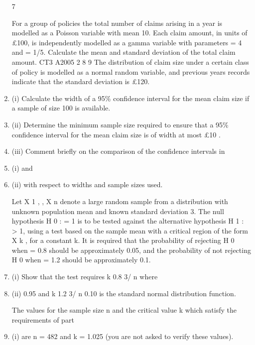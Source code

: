 \documentclass[a4paper,12pt]{article}
\begin{document}
\begin{enumerate}
7

For a group of policies the total number of claims arising in a year is modelled as a Poisson variable with mean 10. Each claim amount, in units of £100, is independently modelled as a gamma variable with parameters = 4 and = 1/5.
Calculate the mean and standard deviation of the total claim amount.
CT3 A2005
2
8
9
The distribution of claim size under a certain class of policy is modelled as a normal random variable, and previous years records indicate that the standard deviation is £120.

\item (i) Calculate the width of a 95\% confidence interval for the mean claim size if a sample of size 100 is available.

\item (ii) Determine the minimum sample size required to ensure that a 95\% confidence interval for the mean claim size is of width at most £10 .

\item (iii) Comment briefly on the comparison of the confidence intervals in \item (i) and \item (ii) with respect to widths and sample sizes used.


Let X 1 , , X n denote a large random sample from a distribution with unknown population mean and known standard deviation 3. The null hypothesis H 0 : = 1 is to be tested against the alternative hypothesis H 1 : > 1, using a test based on the
sample mean with a critical region of the form X
k , for a constant k.
It is required that the probability of rejecting H 0 when = 0.8 should be approximately 0.05, and the probability of not rejecting H 0 when = 1.2 should be approximately 0.1.

\item (i)
Show that the test requires
k 0.8
3/ n
where
\item (ii)
0.95 and
k 1.2
3/ n
0.10
is the standard normal distribution function.

The values for the sample size n and the critical value k which satisfy the requirements of part \item (i) are n = 482 and k = 1.025 (you are not asked to verify these values).


\end{enumerate}
\end{document}
